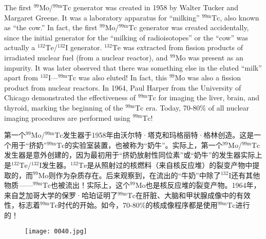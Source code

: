 \documentclass[dvipsnames, svgnames,a4paper,11pt]{article}
\begin{document}
The first ${}^\text{99}\text{Mo}$/${}^\text{99m}\text{Tc}$ generator was created in 1958 by Walter Tucker and Margaret Greene. It was a laboratory apparatus for “milking” ${}^\text{99m}\text{Tc}$, also known as “the cow.” In fact, the first ${}^\text{99}\text{Mo}$/${}^\text{99m}\text{Tc}$ generator was created accidentally, since the initial generator for the “milking of radioisotopes” or the “cow” was actually a ${}^\text{132}\text{Te}$/${}^\text{132}\text{I}$ generator. ${}^\text{132}\text{Te}$ was extracted from fission products of irradiated nuclear fuel (from a nuclear reactor), and ${}^\text{99}\text{Mo}$ was present as an impurity. It was later observed that there was something else in the eluted “milk” apart from ${}^\text{132}\text{I}$—${}^\text{99m}\text{Tc}$ was also eluted! In fact, this ${}^\text{99}\text{Mo}$ was also a fission product from nuclear reactors. In 1964, Paul Harper from the University of Chicago demonstrated the effectiveness of ${}^\text{99m}\text{Tc}$ for imaging the liver, brain, and thyroid, marking the beginning of the ${}^\text{99m}\text{Tc}$ era. Today, 70-80\% of all nuclear imaging procedures are performed using ${}^\text{99m}\text{Tc}$!

第一个${}^\text{99}\text{Mo}$/${}^\text{99m}\text{Tc}$发生器于1958年由沃尔特·塔克和玛格丽特·格林创造。这是一个用于“挤奶”${}^\text{99m}\text{Tc}$的实验室装置，也被称为“奶牛”。实际上，第一个${}^\text{99}\text{Mo}$/${}^\text{99m}\text{Tc}$发生器是意外创建的，因为最初用于“挤奶放射性同位素”或“奶牛”的发生器实际上是${}^\text{132}\text{Te}$/${}^\text{132}\text{I}$发生器。${}^\text{132}\text{Te}$是从照射过的核燃料（来自核反应堆）的裂变产物中提取的，而${}^\text{99}\text{Mo}$则作为杂质存在。后来观察到，在流出的“牛奶”中除了${}^\text{132}\text{I}$还有其他物质——${}^\text{99m}\text{Tc}$也被流出！实际上，这个${}^\text{99}\text{Mo}$也是核反应堆的裂变产物。1964年，来自芝加哥大学的保罗·哈珀证明了${}^\text{99m}\text{Tc}$在肝脏、大脑和甲状腺成像中的有效性，标志着${}^\text{99m}\text{Tc}$时代的开始。如今，70-80\%的核成像程序都是使用${}^\text{99m}\text{Tc}$进行的！

\begin{figure}[htbp]
      \centering
      \texttt{[image: 0040.jpg]}
       \label{fig31}
\end{figure}
\end{document}
